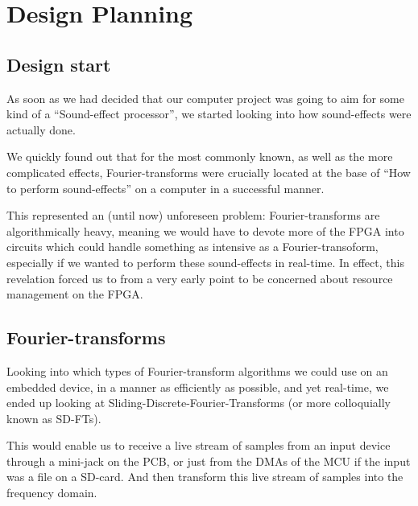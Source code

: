 \FloatBarrier
\section{Design Planning}\label{section:fpga-design}
\FloatBarrier
\subsection{Design start}

As soon as we had decided that our computer project was going to aim for some
kind of a ``Sound-effect processor'', we started looking into how sound-effects
were actually done.

We quickly found out that for the most commonly known, as well as the more
complicated effects, Fourier-transforms were crucially located at the base of
``How to perform sound-effects'' on a computer in a successful manner.

This represented an (until now) unforeseen problem: Fourier-transforms are
algorithmically heavy, meaning we would have to devote more of the FPGA into
circuits which could handle something as intensive as a Fourier-transoform,
especially if we wanted to perform these sound-effects in real-time. In effect,
this revelation forced us to from a very early point to be concerned about
resource management on the FPGA.

\FloatBarrier
\subsection{Fourier-transforms}

Looking into which types of Fourier-transform algorithms we could use on an
embedded device, in a manner as efficiently as possible, and yet real-time,
we ended up looking at Sliding-Discrete-Fourier-Transforms\cite{SD-FT} (or more
colloquially known as SD-FTs).



This would enable us to receive a live stream of samples from an input device
through a mini-jack on the PCB, or just from the DMAs of the MCU if the input
was a file on a SD-card. And then transform this live stream of samples into
the frequency domain.

